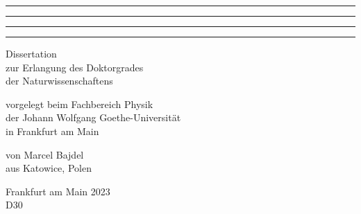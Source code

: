 \begin{titlepage}
\vspace*{0.2cm}
  \begin{center} 
\noindent

	\rule{\textwidth}{1.6pt}\vspace*{-\baselineskip}\vspace*{2pt} %
	\rule{\textwidth}{0.4pt} %
	
	\vspace{0.9\baselineskip} %


	\vspace{0.9\baselineskip} %
	
	\rule{\textwidth}{0.4pt}\vspace*{-\baselineskip}\vspace{3.2pt} %
	\rule{\textwidth}{1.6pt} %
  \end{center}
  
  \vspace*{1.5cm}

  \begin{center} \sffamily\large
    Dissertation\\
    zur Erlangung des Doktorgrades\\
    der Naturwissenschaftens
  \end{center}

  \vspace*{1.5cm}

  \begin{center} \sffamily\large
    vorgelegt beim Fachbereich Physik\\
    der Johann Wolfgang Goethe-Universit\"at\\
    in Frankfurt am Main
  \end{center}

  \vspace*{1.5cm}

  \begin{center} \sffamily\large
    von
    Marcel Bajdel\\
    aus Katowice, Polen
  \end{center}

  \vspace*{1.5cm}

  \begin{center} \sffamily\large
    Frankfurt am Main 2023\\
    D30
  \end{center}

\end{titlepage}
